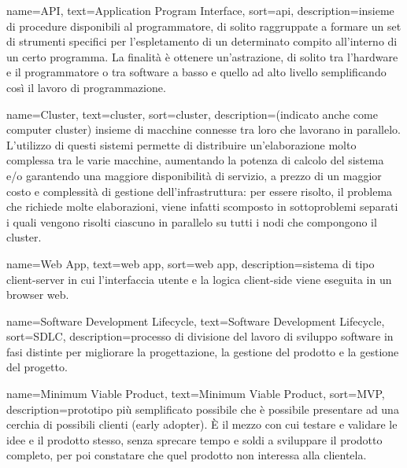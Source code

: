 
\renewcommand{\acronymname}{Acronimi e abbreviazioni}

{
    name=API,
    text=Application Program Interface,
    sort=api,
    description={insieme di procedure disponibili al programmatore, di solito raggruppate a formare un set di strumenti specifici per l'espletamento di un determinato compito all'interno di un certo programma. La finalità è ottenere un'astrazione, di solito tra l'hardware e il programmatore o tra software a basso e quello ad alto livello semplificando così il lavoro di programmazione.}
}

{
    name=Cluster,
    text=cluster,
    sort=cluster,
    description={(indicato anche come computer cluster) insieme di macchine connesse tra loro che lavorano in parallelo.
    L'utilizzo di questi sistemi permette di distribuire un'elaborazione molto complessa tra le varie macchine, aumentando la potenza di calcolo del sistema e/o garantendo una maggiore disponibilità di servizio, a prezzo di un maggior costo e complessità di gestione dell'infrastruttura: per essere risolto, il problema che richiede molte elaborazioni, viene infatti scomposto in sottoproblemi separati i quali vengono risolti ciascuno in parallelo su tutti i nodi che compongono il cluster.}
}

{
	name=Web App,
	text=web app,
	sort=web app,
	description={sistema di tipo client-server in cui l'interfaccia utente e la logica client-side viene eseguita in un browser web.}
}

{
	name=Software Development Lifecycle,
	text=Software Development Lifecycle,
	sort=SDLC,
	description={processo di divisione del lavoro di sviluppo software in fasi distinte per migliorare la progettazione, la gestione del prodotto e la gestione del progetto.}
}

{
	name=Minimum Viable Product,
	text=Minimum Viable Product,
	sort=MVP,
	description={prototipo più semplificato possibile che è possibile presentare ad una cerchia di possibili clienti (early adopter). È il mezzo con cui testare e validare le idee e il prodotto stesso, senza sprecare tempo e soldi a sviluppare il prodotto completo, per poi constatare che quel prodotto non interessa alla clientela.}
}

